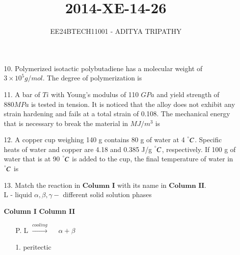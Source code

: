 \documentclass[journal,12pt,onecolumn]{IEEEtran}
\theoremstyle{remark}
\begin{document}

\vspace{3cm}

\title{2014-XE-14-26}
\author{EE24BTECH11001 -  ADITYA TRIPATHY}
\maketitle

\renewcommand{\thefigure}{\theenumi}
\renewcommand{\thetable}{\theenumi}

\begin{enumerate}
    \item[10.] 
        Polymerized isotactic polybutadiene has a molecular weight of $3 \times 10^5 g/mol$. The degree of
        polymerization is
        \hfill{}
\\
    \item[11.]  A bar of $Ti$ with Young's modulus of 110 $GPa$ and yield strength of $880 MPa$ is tested in tension. It
        is noticed that the alloy does not exhibit any strain hardening and fails at a total strain of 0.108. The
        mechanical energy that is necessary to break the material in $MJ/m^3$ is		
        \hfill{}
\\
    \item[12.] A copper cup weighing 140 g contains 80 g of water at 4 $^{\degree}C$. Specific heats of water and copper are
        4.18 and 0.385 J/g $^{\degree}C$, respectively. If 100 g of water that is at 90 $^{\degree}C$ is added to the cup, the final
        temperature of water in $^{\degree}C$ is
        \hfill{}
        \\

    \item[13.] Match the reaction in $\textbf{Column I}$ with its name in $\textbf{Column II}$.\\
        L - liquid $\alpha, \beta, \gamma -$ different solid solution phases

        \begin{multicols}{2}
            \textbf{Column I} \columnbreak
            \textbf{Column II}
        \end{multicols}
        \begin{multicols}{2}
            \begin{enumerate}
                \item[P.] L $\xrightarrow{cooling}$ $\quad \alpha + \beta$ \columnbreak
                \item[1.] peritectic
            \end{enumerate}


\end{multicols}
\end{enumerate}
\end{document}
